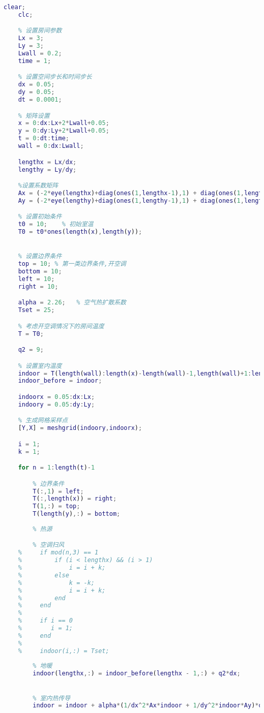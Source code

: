 \begin{lstlisting}[language = matlab]
    clear;
    clc;

    % 设置房间参数
    Lx = 3;
    Ly = 3;
    Lwall = 0.2;
    time = 1;

    % 设置空间步长和时间步长
    dx = 0.05;
    dy = 0.05;
    dt = 0.0001;

    % 矩阵设置
    x = 0:dx:Lx+2*Lwall+0.05;
    y = 0:dy:Ly+2*Lwall+0.05;
    t = 0:dt:time;
    wall = 0:dx:Lwall;

    lengthx = Lx/dx;
    lengthy = Ly/dy;

    %设置系数矩阵
    Ax = (-2*eye(lengthx)+diag(ones(1,lengthx-1),1) + diag(ones(1,lengthx-1),-1));
    Ay = (-2*eye(lengthy)+diag(ones(1,lengthy-1),1) + diag(ones(1,lengthy-1),-1));

    % 设置初始条件
    t0 = 10;    % 初始室温
    T0 = t0*ones(length(x),length(y));


    % 设置边界条件
    top = 10; % 第一类边界条件,开空调
    bottom = 10;
    left = 10;
    right = 10;

    alpha = 2.26;   % 空气热扩散系数
    Tset = 25;

    % 考虑开空调情况下的房间温度
    T = T0;

    q2 = 9;

    % 设置室内温度
    indoor = T(length(wall):length(x)-length(wall)-1,length(wall)+1:length(y)-length(wall));
    indoor_before = indoor;

    indoorx = 0.05:dx:Lx;
    indoory = 0.05:dy:Ly;

    % 生成网格采样点
    [Y,X] = meshgrid(indoory,indoorx);

    i = 1;
    k = 1;

    for n = 1:length(t)-1

        % 边界条件
        T(:,1) = left;
        T(:,length(x)) = right;
        T(1,:) = top;
        T(length(y),:) = bottom;
        
        % 热源

        % 空调扫风
    %     if mod(n,3) == 1
    %         if (i < lengthx) && (i > 1) 
    %             i = i + k;        
    %         else
    %             k = -k;
    %             i = i + k;
    %         end
    %     end
    % 
    %     if i == 0 
    %        i = 1;
    %     end
    %     
    %     indoor(i,:) = Tset;
        
        % 地暖
        indoor(lengthx,:) = indoor_before(lengthx - 1,:) + q2*dx;


        % 室内热传导
        indoor = indoor + alpha*(1/dx^2*Ax*indoor + 1/dy^2*indoor*Ay)*dt;


\end{lstlisting}
